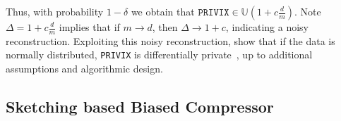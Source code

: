 \documentclass[11pt]{article}
\begin{document}
Thus, with probability $1-\delta$ we obtain that $\texttt{PRIVIX}\in \mathbb{U}(1+c\frac{d}{m})$.
Note $\Delta=1+c\frac{d}{m}$ implies that if $m\rightarrow d$, then $\Delta\rightarrow 1+c$, indicating a noisy reconstruction. 
Exploiting this noisy reconstruction, \citet{li2019privacy} show that if the data is normally distributed, \texttt{PRIVIX} is differentially private~\citep{DBLP:conf/icalp/Dwork06}, up to additional assumptions and algorithmic design.  


\vspace{-0.05in}
\subsection{Sketching based Biased Compressor}
\vspace{-0.05in}
\end{document}
